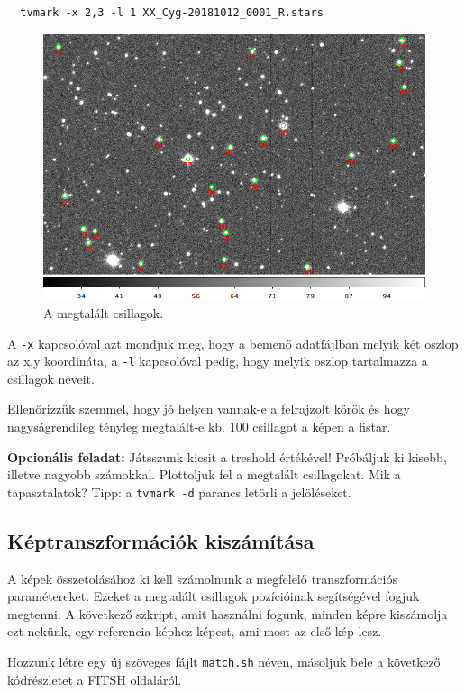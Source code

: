 \documentclass{article}
\begin{document}
\begin{verbatim}
  tvmark -x 2,3 -l 1 XX_Cyg-20181012_0001_R.stars
\end{verbatim}

\begin{figure}
    \centering
    \includegraphics[width=0.8\linewidth]{pics/tvmark.png}
    \caption{A megtalált csillagok.}
    \label{stars}
\end{figure}

A \verb+-x+ kapcsolóval azt mondjuk meg, hogy a bemenő adatfájlban melyik két oszlop
az x,y koordináta, a \verb+-l+ kapcsolóval pedig, hogy melyik oszlop tartalmazza a
csillagok neveit.

Ellenőrizzük szemmel, hogy jó helyen vannak-e a felrajzolt körök és hogy
nagyságrendileg tényleg megtalált-e kb. 100 csillagot a képen a fistar.

{\bf Opcionális feladat:}
Játsszunk kicsit a treshold értékével! Próbáljuk ki kisebb, illetve nagyobb
számokkal. Plottoljuk fel a megtalált csillagokat. Mik a tapasztalatok?
Tipp: a \verb+tvmark -d+ parancs letörli a jelöléseket.

\subsection{Képtranszformációk kiszámítása}

A képek összetolásához ki kell számolnunk a megfelelő transzformációs
paramétereket. Ezeket a megtalált csillagok pozícióinak segítségével fogjuk
megtenni. A következő szkript, amit használni fogunk, minden képre kiszámolja
ezt nekünk, egy referencia képhez képest, ami most az első kép lesz.

Hozzunk létre egy új szöveges fájlt \verb+match.sh+ néven, másoljuk bele a következő kódrészletet a FITSH oldaláról.
\end{document}
